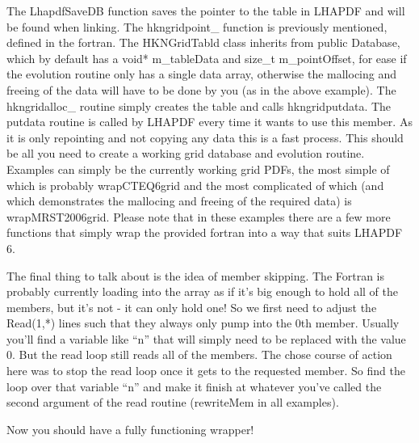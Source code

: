 The LhapdfSaveDB function saves the pointer to the table in LHAPDF and will
be found when linking. The hkngridpoint\_ function is previously mentioned, 
defined in the fortran. The HKNGridTabld class inherits from public 
Database, which by default has a void* m\_tableData and size\_t 
m\_pointOffset, for ease if the evolution routine only has a single data 
array, otherwise the mallocing and freeing of the data will have to be done
by you (as in the above example). The hkngridalloc\_ routine simply creates
the table and calls hkngridputdata. The putdata routine is called by LHAPDF 
every time it wants to use this member. As it is only repointing and not 
copying any data this is a fast process. This should be all you need to 
create a working grid database and evolution routine. Examples can simply 
be the currently working grid  PDFs, the most simple of which is probably 
wrapCTEQ6grid and the most complicated of which (and which demonstrates 
the mallocing and freeing of the required data) is wrapMRST2006grid. 
Please note that in these examples there are a few more functions that 
simply wrap the provided fortran into a way that suits LHAPDF 6.
  
The final thing to talk about is the idea of member skipping. The Fortran
is probably currently loading into the array as if it's big enough to hold
all of the members, but it's not - it can only hold one! So we first need
to adjust the Read(1,*) lines such that they always only pump into the 0th
member. Usually you'll find a variable like ``n'' that will simply need to
be replaced with the value 0. But the read loop still reads all of the
members. The chose course of action here was to stop the read loop once it
gets to the requested member. So find the loop over that variable ``n'' and
make it finish at whatever you've called the second argument of the read
routine (rewriteMem in all examples).

Now you should have a fully functioning wrapper!
